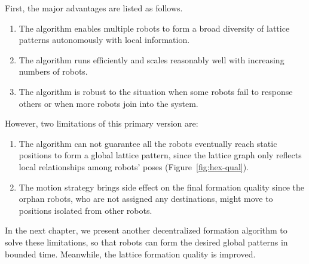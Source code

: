 First, the major advantages are listed as follows.
\begin{enumerate}
\item The algorithm enables multiple robots to form a broad diversity of lattice patterns autonomously with local information.
\item The algorithm runs efficiently and scales reasonably well with increasing numbers of robots.
\item The algorithm is robust to the situation when some robots fail to response others or when more robots join into the system.
\end{enumerate}


However, two limitations of this primary version are:
\begin{enumerate}
\item The algorithm can not guarantee all the robots eventually reach static positions to form a global lattice pattern, since the lattice graph only reflects local relationships among robots' poses (Figure~\ref{fig:hex-qual}).
\item The motion strategy brings side effect on the final formation quality since the orphan robots, who are not assigned any destinations, might move to positions isolated from other robots.
\end{enumerate}

In the next chapter, we present another decentralized formation algorithm to solve these limitations, so that robots can form the desired global patterns in bounded time. 
Meanwhile, the lattice formation quality is improved.